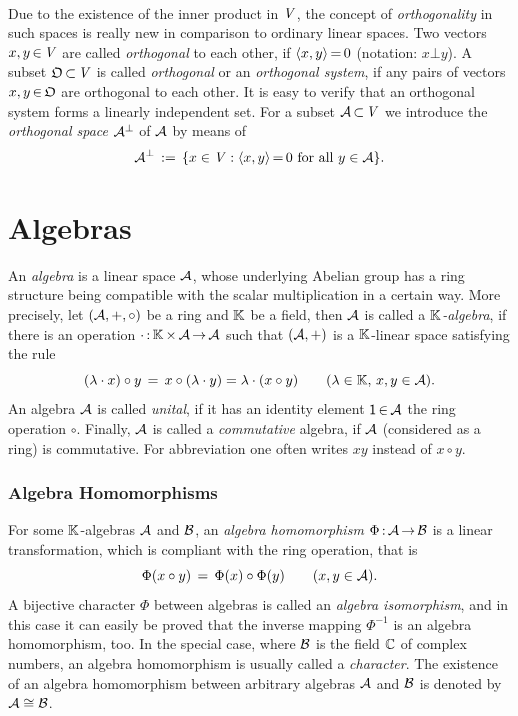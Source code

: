 \documentclass[11pt,twoside]{article}
\begin{document}
\paragraph{}
Due to the existence of the inner product in $\mathit{V}$,
the concept of \textit{orthogonality} in such spaces is really new
in comparison to ordinary linear spaces.
Two vectors $x,y {\,\in\,} \mathit{V}$ are called \textit{orthogonal} to each other,
if $\langle x,y \rangle {\,=\,} 0$ (notation: $x \bot y$).
A subset $\mathfrak{O} {\,\subset\,} \mathit{V}$ is called \textit{orthogonal}
or an \textit{orthogonal system},
if any pairs of vectors $x,y {\,\in\,} \mathfrak{O}$ are orthogonal to each other.
It is easy to verify
that an orthogonal system forms a linearly independent set.
For a subset $\mathcal{A} {\,\subset\,} \mathit{V}$ we introduce the \textit{orthogonal space}
$ \mathcal{A}^{\bot}$ of $\mathcal{A}$ by means of
\[
\mathcal{A}^{\bot} \,:=\,
\{ x \in \mathit{V}: \langle x,y \rangle {\,=\,} 0 \mbox{ for all } y \in \mathcal{A} \}.
\]

\part{Algebras}                                                                %
An \textit{algebra} is a linear space ${\mathcal{A}}$,
whose underlying Abelian group has a ring structure
being compatible with the scalar multiplication in a certain way.
More precisely,
let $({\mathcal{A}},+,\circ)$ be a ring and ${\mathbb{K}}$ be a field, then
${\mathcal{A}}$ is called a \textit{${\mathbb{K}}$-algebra},
if there is an operation $\cdot {\,:\,}{\mathbb{K}} {\,\times\,} {\mathcal{A}} {\,\to\,} {\mathcal{A}}$
such that $({\mathcal{A}},+)$ is a ${\mathbb{K}}$-linear space
satisfying the rule
\[
(\lambda \cdot x) \circ y
\,=\,
x \circ (\lambda \cdot y) = \lambda \cdot (x \circ y)
\quad \quad
(\lambda \in {\mathbb{K}}, \, x,y \in {\mathcal{A}}).
\]
An algebra ${\mathcal{A}}$ is called \textit{unital},
if it has an identity element ${\mathsf{1}} {\,\in\,} {\mathcal{A}}$ {\wrt} the ring operation $\circ$.
Finally, ${\mathcal{A}}$ is called a \textit{commutative} algebra,
if ${\mathcal{A}}$ (considered as a ring) is commutative.
For abbreviation one often writes $xy$ instead of $x \circ y$.

\section{Algebra Homomorphisms}
For some ${\mathbb{K}}$-algebras ${\mathcal{A}}$ and ${\mathcal{B}}$,
an \textit{algebra homomorphism} $\Phi {\,:\,}{\mathcal{A}} {\,\to\,} {\mathcal{B}}$
is a linear trans\-formation,
which is compliant with the ring operation, that is
\[
\Phi(x \circ y) \,=\, \Phi(x) \circ \Phi(y) \quad \quad (x,y \in {\mathcal{A}}).
\]
A bijective character $\Phi$ between algebras is called
an \textit{algebra isomorphism},
and in this case it can easily be proved
that the inverse mapping $\Phi^{-1}$ is an algebra homomorphism, too.
In the special case,
where ${\mathcal{B}}$ is the field ${\mathbb{C}}$ of complex numbers,
an algebra homomorphism is usually called a \textit{character}.
The existence of an algebra homomorphism between arbitrary algebras 
${\mathcal{A}}$ and ${\mathcal{B}}$ is denoted by ${\mathcal{A}} \cong {\mathcal{B}}$.
\end{document}
